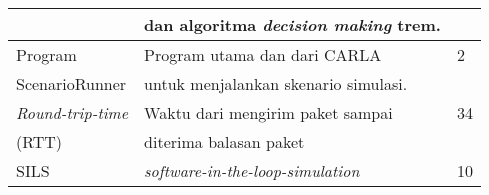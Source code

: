 \begin{table*}[!ht]
\begin{tabular}{|l|l|l|}
		                           & dan algoritma \textit{decision making} trem. &                  \\
		\hline
		Program                    & Program utama dan dari CARLA                 & 2                \\
		ScenarioRunner             & untuk menjalankan skenario simulasi.         &                  \\
		\hline
		\textit{Round-trip-time}   & Waktu dari mengirim paket sampai             & 34               \\
		(RTT)                      & diterima balasan paket                       &                  \\
		\hline
		SILS                       & \textit{software-in-the-loop-simulation}     & 10               \\
		\hline
	\end{tabular}
\end{table*}
